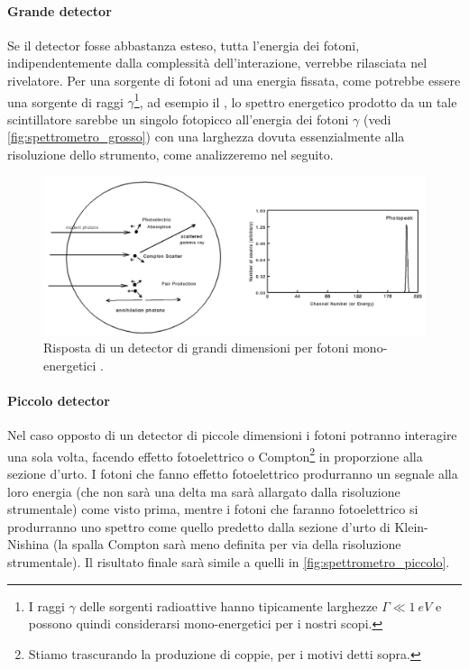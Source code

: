  \paragraph{Grande detector} Se il detector fosse abbastanza esteso, tutta l'energia dei fotoni, indipendentemente dalla complessità dell'interazione, verrebbe rilasciata nel rivelatore. Per una sorgente di fotoni ad una energia fissata, come potrebbe essere una sorgente di raggi $\gamma$\footnote{I raggi $\gamma$ delle sorgenti radioattive hanno tipicamente larghezze $\Gamma \ll \SI{1}{eV}$ e possono quindi considerarsi mono-energetici per i nostri scopi.},
 ad esempio il \cs, lo spettro energetico prodotto da un tale scintillatore sarebbe un singolo fotopicco all'energia dei fotoni $\gamma$ (vedi \autoref{fig:spettrometro_grosso}) con una larghezza dovuta essenzialmente alla risoluzione dello strumento, come analizzeremo nel seguito.
 
 \begin{figure}[h]
 	\centering
 	\includegraphics[width=\textwidth]{spettrometro_grosso}
 	\caption{\label{fig:spettrometro_grosso}
	Risposta di un detector di grandi dimensioni per fotoni mono-energetici \cite{6}.}
 \end{figure}

 \paragraph{Piccolo detector}Nel caso opposto di un detector di piccole dimensioni i fotoni potranno interagire una sola volta, facendo effetto fotoelettrico o Compton\footnote{Stiamo trascurando la produzione di coppie, per i motivi detti sopra.} in proporzione alla sezione d'urto. I fotoni che fanno effetto fotoelettrico produrranno un segnale alla loro energia (che non sarà una delta ma sarà allargato dalla risoluzione strumentale) come visto prima, mentre i fotoni che faranno fotoelettrico si produrranno uno spettro come quello predetto dalla sezione d'urto di Klein-Nishina (la spalla Compton sarà meno definita per via della risoluzione strumentale).
Il risultato finale sarà simile a quelli in \autoref{fig:spettrometro_piccolo}.
 
